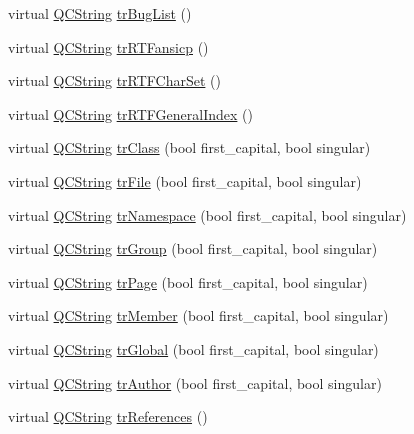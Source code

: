 \begin{DoxyCompactItemize}
\item 
virtual \hyperlink{class_q_c_string}{Q\-C\-String} \hyperlink{class_translator_slovene_a6922767c9b6ff214503967c6f8b66468}{tr\-Bug\-List} ()
\item 
virtual \hyperlink{class_q_c_string}{Q\-C\-String} \hyperlink{class_translator_slovene_ac711f1a109c3c8131bf02a9ff6f48e36}{tr\-R\-T\-Fansicp} ()
\item 
virtual \hyperlink{class_q_c_string}{Q\-C\-String} \hyperlink{class_translator_slovene_af3bba50fd4e382b113171e132e88719b}{tr\-R\-T\-F\-Char\-Set} ()
\item 
virtual \hyperlink{class_q_c_string}{Q\-C\-String} \hyperlink{class_translator_slovene_a6a04ffa0f1114981e258cf0a94478c98}{tr\-R\-T\-F\-General\-Index} ()
\item 
virtual \hyperlink{class_q_c_string}{Q\-C\-String} \hyperlink{class_translator_slovene_a2b5bc0be4e846d4ee6e3430ddeb3cf53}{tr\-Class} (bool first\-\_\-capital, bool singular)
\item 
virtual \hyperlink{class_q_c_string}{Q\-C\-String} \hyperlink{class_translator_slovene_abb09819793310c18e4b39a4691b8e681}{tr\-File} (bool first\-\_\-capital, bool singular)
\item 
virtual \hyperlink{class_q_c_string}{Q\-C\-String} \hyperlink{class_translator_slovene_a5e5011ab1245fd64707347dae129c574}{tr\-Namespace} (bool first\-\_\-capital, bool singular)
\item 
virtual \hyperlink{class_q_c_string}{Q\-C\-String} \hyperlink{class_translator_slovene_a2825eb7956ddf759028c8957352e627d}{tr\-Group} (bool first\-\_\-capital, bool singular)
\item 
virtual \hyperlink{class_q_c_string}{Q\-C\-String} \hyperlink{class_translator_slovene_a719e433b483932299fd17e751decdfb2}{tr\-Page} (bool first\-\_\-capital, bool singular)
\item 
virtual \hyperlink{class_q_c_string}{Q\-C\-String} \hyperlink{class_translator_slovene_aaded5c915d8cd335abcd0e65e535cd71}{tr\-Member} (bool first\-\_\-capital, bool singular)
\item 
virtual \hyperlink{class_q_c_string}{Q\-C\-String} \hyperlink{class_translator_slovene_ac9f8f800abe2f721d9cf0bdfc9b6ec6f}{tr\-Global} (bool first\-\_\-capital, bool singular)
\item 
virtual \hyperlink{class_q_c_string}{Q\-C\-String} \hyperlink{class_translator_slovene_a8ce93b65c315fc4e942a1dc4cc80fa54}{tr\-Author} (bool first\-\_\-capital, bool singular)
\item 
virtual \hyperlink{class_q_c_string}{Q\-C\-String} \hyperlink{class_translator_slovene_a54eaa9a933568bfd7eaffe36b7872eb0}{tr\-References} ()

\end{DoxyCompactItemize}
